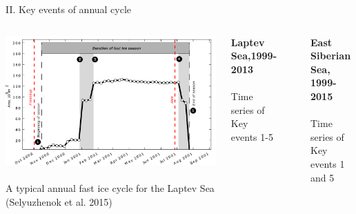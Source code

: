 \documentclass[8pt]{beamer}
\newcommand\Fontvi{\fontsize{6}{7.2}\selectfont}
\begin{document}
\setwatermark{\fontsize{125pt}{125pt}\selectfont{}}
\begin{frame}[fragile]{II. Key events of annual cycle}
	\begin{columns}
		\includegraphics[width=1.0\textwidth]{./img/Key_events_LS0.pdf}\\~\\
	A typical annual fast ice cycle for the Laptev Sea
		\Fontvi
	(Selyuzhenok et al. 2015)
			\begin{center}
				\textbf{Laptev Sea,1999-2013 }\\~\\
				Time series of Key events  1-5
			\end{center}
			~\\
			\begin{center}
				\textbf{East Siberian Sea, 1999-2015}\\~\\
				Time series of Key events  1 and 5\\~\\
			\end{center}
		\end{columns}
\end{frame}
\end{document}

